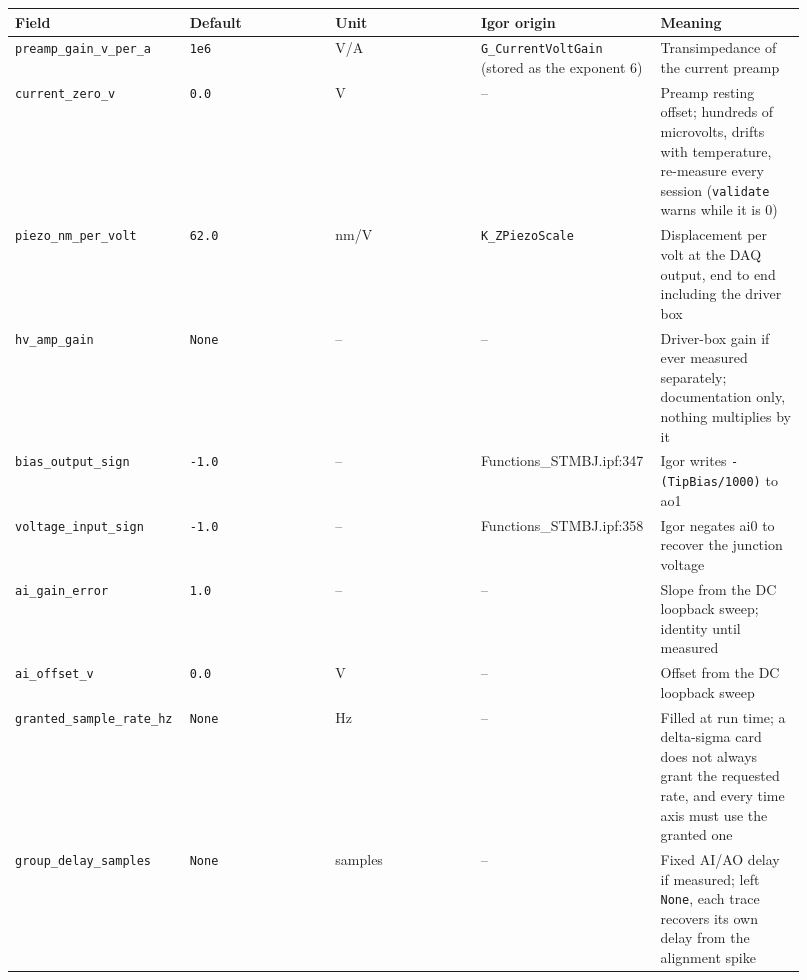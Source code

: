 \footnotesize\setlength{\LTleft}{0pt}\setlength{\LTright}{\fill}
\begin{longtable}{@{}>{\raggedright\arraybackslash}p{0.184\linewidth}>{\raggedright\arraybackslash}p{0.184\linewidth}>{\raggedright\arraybackslash}p{0.184\linewidth}>{\raggedright\arraybackslash}p{0.184\linewidth}>{\raggedright\arraybackslash}p{0.184\linewidth}@{}}
\toprule
\textbf{Field} & \textbf{Default} & \textbf{Unit} & \textbf{Igor origin} & \textbf{Meaning} \\
\midrule\endhead
\texttt{preamp\_\discretionary{}{}{}gain\_\discretionary{}{}{}v\_\discretionary{}{}{}per\_\discretionary{}{}{}a} & \texttt{1e6} & V/A & \texttt{G\_\discretionary{}{}{}Current\discretionary{}{}{}Volt\discretionary{}{}{}Gain} (stored as the exponent 6) & Transimpedance of the current preamp \\
\texttt{current\_\discretionary{}{}{}zero\_\discretionary{}{}{}v} & \texttt{0.\discretionary{}{}{}0} & V & -- & Preamp resting offset; hundreds of microvolts, drifts with temperature, re-measure every session (\texttt{validate} warns while it is 0) \\
\texttt{piezo\_\discretionary{}{}{}nm\_\discretionary{}{}{}per\_\discretionary{}{}{}volt} & \texttt{62.\discretionary{}{}{}0} & nm/V & \texttt{K\_\discretionary{}{}{}ZPiezo\discretionary{}{}{}Scale} & Displacement per volt at the DAQ output, end to end including the driver box \\
\texttt{hv\_\discretionary{}{}{}amp\_\discretionary{}{}{}gain} & \texttt{None} & -- & -- & Driver-box gain if ever measured separately; documentation only, nothing multiplies by it \\
\texttt{bias\_\discretionary{}{}{}output\_\discretionary{}{}{}sign} & \texttt{-1.\discretionary{}{}{}0} & -- & Functions\_STMBJ.ipf:347 & Igor writes \texttt{-(Tip\discretionary{}{}{}Bias/\discretionary{}{}{}1000)} to ao1 \\
\texttt{voltage\_\discretionary{}{}{}input\_\discretionary{}{}{}sign} & \texttt{-1.\discretionary{}{}{}0} & -- & Functions\_STMBJ.ipf:358 & Igor negates ai0 to recover the junction voltage \\
\texttt{ai\_\discretionary{}{}{}gain\_\discretionary{}{}{}error} & \texttt{1.\discretionary{}{}{}0} & -- & -- & Slope from the DC loopback sweep; identity until measured \\
\texttt{ai\_\discretionary{}{}{}offset\_\discretionary{}{}{}v} & \texttt{0.\discretionary{}{}{}0} & V & -- & Offset from the DC loopback sweep \\
\texttt{granted\_\discretionary{}{}{}sample\_\discretionary{}{}{}rate\_\discretionary{}{}{}hz} & \texttt{None} & Hz & -- & Filled at run time; a delta-sigma card does not always grant the requested rate, and every time axis must use the granted one \\
\texttt{group\_\discretionary{}{}{}delay\_\discretionary{}{}{}samples} & \texttt{None} & samples & -- & Fixed AI/AO delay if measured; left \texttt{None}, each trace recovers its own delay from the alignment spike \\
\bottomrule
\end{longtable}
\normalsize

